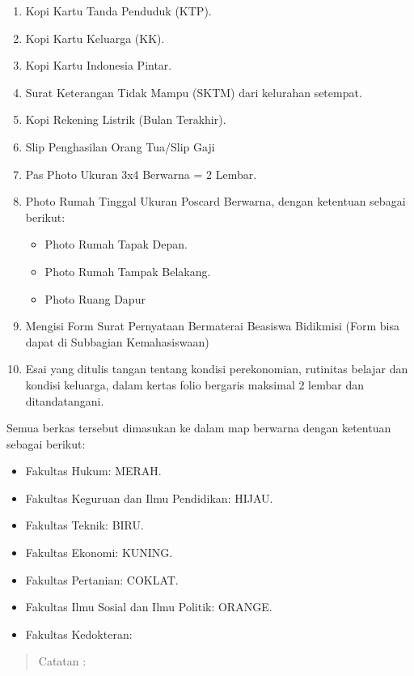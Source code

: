 \documentclass[
]{book}
\providecommand{\tightlist}{%
  \setlength{\itemsep}{0pt}\setlength{\parskip}{0pt}}
\begin{document}
\begin{enumerate}
\def\labelenumi{\alph{enumi}.}
\item
  Kopi Kartu Tanda Penduduk (KTP).
\item
  Kopi Kartu Keluarga (KK).
\item
  Kopi Kartu Indonesia Pintar.
\item
  Surat Keterangan Tidak Mampu (SKTM) dari kelurahan setempat.
\item
  Kopi Rekening Listrik (Bulan Terakhir).
\item
  Slip Penghasilan Orang Tua/Slip Gaji
\item
  Pas Photo Ukuran 3x4 Berwarna = 2 Lembar.
\item
  Photo Rumah Tinggal Ukuran Poscard Berwarna, dengan ketentuan sebagai berikut:

  \begin{itemize}
  \tightlist
  \item
    Photo Rumah Tapak Depan.
  \item
    Photo Rumah Tampak Belakang.
  \item
    Photo Ruang Dapur
  \end{itemize}
\item
  Mengisi Form Surat Pernyataan Bermaterai Beasiswa Bidikmisi (Form bisa dapat di Subbagian Kemahasiswaan)
\item
  Esai yang ditulis tangan tentang kondisi perekonomian, rutinitas belajar dan kondisi keluarga, dalam kertas folio bergaris maksimal 2 lembar dan ditandatangani.
\end{enumerate}

Semua berkas tersebut dimasukan ke dalam map berwarna dengan ketentuan sebagai berikut:

\begin{itemize}
\tightlist
\item
  Fakultas Hukum: MERAH.
\item
  Fakultas Keguruan dan Ilmu Pendidikan: HIJAU.
\item
  Fakultas Teknik: BIRU.
\item
  Fakultas Ekonomi: KUNING.
\item
  Fakultas Pertanian: COKLAT.
\item
  Fakultas Ilmu Sosial dan Ilmu Politik: ORANGE.
\item
  Fakultas Kedokteran:
\end{itemize}

\begin{quote}
Catatan :
\end{quote}
\end{document}
